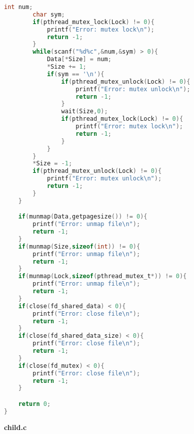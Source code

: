 \documentclass[pdf, unicode, 12pt, a4paper,oneside,fleqn]{article}
\begin{document}
\begin{lstlisting}[language=C]
        int num;
        char sym;
        if(pthread_mutex_lock(Lock) != 0){
            printf("Error: mutex lock\n");
            return -1;
        }
        while(scanf("%d%c",&num,&sym) > 0){
            Data[*Size] = num;
            *Size += 1;
            if(sym == '\n'){
                if(pthread_mutex_unlock(Lock) != 0){
                    printf("Error: mutex unlock\n");
                    return -1;
                }
                wait(Size,0);
                if(pthread_mutex_lock(Lock) != 0){
                    printf("Error: mutex lock\n");
                    return -1;
                }
            }
        }
        *Size = -1;
        if(pthread_mutex_unlock(Lock) != 0){
            printf("Error: mutex unlock\n");
            return -1;
        }
    }

    if(munmap(Data,getpagesize()) != 0){
        printf("Error: unmap file\n");
        return -1;
    }
    if(munmap(Size,sizeof(int)) != 0){
        printf("Error: unmap file\n");
        return -1;
    }
    if(munmap(Lock,sizeof(pthread_mutex_t*)) != 0){
        printf("Error: unmap file\n");
        return -1;
    }
    if(close(fd_shared_data) < 0){
        printf("Error: close file\n");
        return -1;
    }
    if(close(fd_shared_data_size) < 0){
        printf("Error: close file\n");
        return -1;
    }
    if(close(fd_mutex) < 0){
        printf("Error: close file\n");
        return -1;
    }

    return 0;
}
\end{lstlisting}

{\large\textbf{child.c}}
\end{document}
